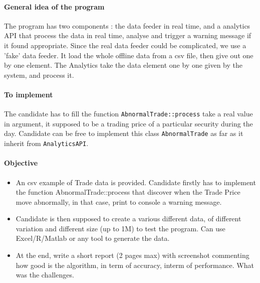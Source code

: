 \documentclass{exam}%
\begin{document}
\paragraph{General idea of the program}
The program has two components : the data feeder in real time, and a analytics API that process the data in real time, analyse and trigger a warning message if it found appropriate. Since the real data feeder could be complicated, we use a 'fake' data feeder. It load the whole offline data from a csv file, then give out one by one element. The Analytics take the data element one by one given by the system, and process it.

\paragraph{To implement}
The candidate has to fill the function \lstinline{AbnormalTrade::process} take a real value in argument, it supposed to be a trading price of a particular security during the day. Candidate can be free to implement this class \lstinline{AbnormalTrade} as far as it inherit from \lstinline{AnalyticsAPI}.

\paragraph{Objective}
\begin{itemize}
	\item An csv example of Trade data is provided. Candidate firstly has to implement the function AbnormalTrade::process that discover when the Trade Price move abnormally, in that case, print to console a warning message.
	\item Candidate is then supposed to create a various different data, of different variation and different size (up to 1M) to test the program. Can use Excel/R/Matlab or any tool to generate the data. 
	\item At the end, write a short report (2 pages max) with screenshot commenting how good is the algorithm, in term of accuracy, interm of performance. What was the challenges.
\end{itemize}
\end{document}
